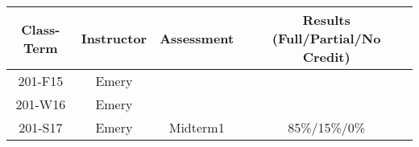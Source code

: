 \begin{outcomes}
	\begin{center}
		\begin{tabular}{cccc}
			\hline\hline
                Class-Term & Instructor & Assessment & Results (Full/Partial/No Credit) \\
			\hline
                201-F15 & Emery &  &  \\
                201-W16 & Emery &  &  \\
                201-S17 & Emery & Midterm1 & 85\%/15\%/0\%\\
			\hline
		\end{tabular}
	\end{center}
\end{outcomes}

\begin{comments}
	
\end{comments}
